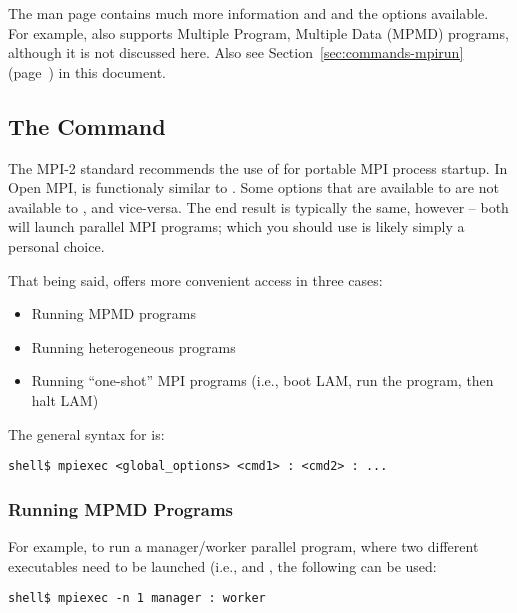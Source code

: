 The  man page contains much more information and
 and the options available.  For example, 
also supports Multiple Program, Multiple Data (MPMD) programs,
although it is not discussed here.  Also see
Section~\ref{sec:commands-mpirun} (page~\pageref{sec:commands-mpirun})
in this document.


\subsection{The  Command}

The MPI-2 standard recommends the use of  for portable
MPI process startup.  In Open MPI,  is functionaly similar
to .  Some options that are available to  are
not available to , and vice-versa.  The end result is
typically the same, however -- both will launch parallel MPI programs;
which you should use is likely simply a personal choice.

That being said,  offers more convenient access in three
cases:

\begin{itemize}
\item Running MPMD programs
\item Running heterogeneous programs
\item Running ``one-shot'' MPI programs (i.e., boot LAM, run the
  program, then halt LAM)
\end{itemize}

The general syntax for  is:

\lstset{style=lam-cmdline}
\begin{lstlisting}
shell$ mpiexec <global_options> <cmd1> : <cmd2> : ...
\end{lstlisting}


\subsubsection{Running MPMD Programs}

For example, to run a manager/worker parallel program, where two
different executables need to be launched (i.e.,  and
, the following can be used:

\lstset{style=lam-cmdline}
\begin{lstlisting}
shell$ mpiexec -n 1 manager : worker
\end{lstlisting}

